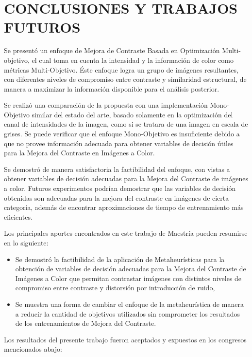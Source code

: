 \chapter{CONCLUSIONES Y TRABAJOS\\ FUTUROS}
\label{sec:conclusion}

Se presentó un enfoque de Mejora de Contraste Basada en Optimización Multi-objetivo, el cual toma en cuenta la intensidad y la información de color como métricas Multi-Objetivo. Éste enfoque logra un grupo de imágenes resultantes, con diferentes niveles de compromiso entre contraste y similaridad estructural, de manera a maximizar la información disponible para el análisis posterior.

Se realizó una comparación de la propuesta con una implementación Mono-Objetivo similar del estado del arte, basado solamente en la optimización del canal de intensidades de la imagen, como si se tratara de una imagen en escala de grises. Se puede verificar que el enfoque Mono-Objetivo es insuficiente debido a que no provee información adecuada para obtener variables de decisión útiles para la Mejora del Contraste en Imágenes a Color.

Se demostró de manera satisfactoria la factibilidad del enfoque, con vistas a obtener variables de decisión adecuadas para la Mejora del Contraste de imágenes a color. Futuros experimentos podrían demostrar que las variables de decisión obtenidas son adecuadas para la mejora del contraste en imágenes de cierta categoría, además de encontrar aproximaciones de tiempo de entrenamiento más eficientes.

Los principales aportes encontrados en este trabajo de Maestría pueden resumirse en lo siguiente:

\begin{itemize}
	\item Se demostró la factibilidad de la aplicación de Metaheurísticas para la obtención de variables de decisión adecuadas para la Mejora del Contraste de Imágenes a Color que permitan contrastar imágenes con distintos niveles de compromiso entre contraste y distorsión por introducción de ruido,

	\item Se muestra una forma de cambiar el enfoque de la metaheurística de manera a reducir la cantidad de objetivos utilizados sin comprometer los resultados de los entrenamientos de Mejora del Contraste.
\end{itemize}

Los resultados del presente trabajo fueron aceptados y expuestos en los congresos mencionados abajo:

